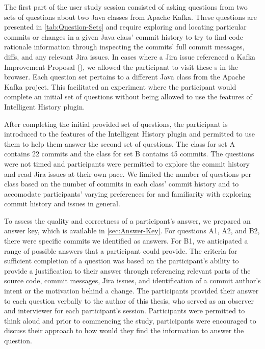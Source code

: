 The first part of the user study session consisted of asking questions from two sets of questions about two Java classes from Apache Kafka.
These questions are presented in \autoref{tab:Question-Sets} and require exploring and 
locating particular commits or changes in a given Java class' commit history to try to find code rationale information through inspecting the commits' full commit messages,
diffs, and any relevant Jira issues.
In cases where a Jira issue referenced a Kafka Improvement Proposal (), we allowed the participant to visit these s in the browser.
Each question set pertains to a different Java class from the Apache Kafka project.
This facilitated an experiment where the participant would complete an initial set of questions without being allowed to use the features of Intelligent History plugin.

After completing the initial provided set of questions, the participant is introduced to the features of the Intelligent History plugin and permitted to use them to help them answer the second set of questions.
The  class for set A contains 22 commits and the  class for set B contains 45 commits.
The questions were not timed and participants were permitted to explore the commit history and read Jira issues at their own pace.
We limited the number of questions per class based on the number of commits in each class' commit history and 
to accomodate participants' varying preferences for and familiarity with exploring commit history and issues in general.

To assess the quality and correctness of a participant's answer, we prepared an answer key, which is available in \autoref{sec:Answer-Key}.
For questions A1, A2, and B2, there were specific commits we identified as answers.
For B1, we anticipated a range of possible answers that a participant could provide.
The criteria for sufficient completion of a question was based on the participant's ability to provide a justification to their answer through referencing relevant parts of the source code, commit messages, Jira issues, and
identification of a commit author's intent or the motivation behind a change.
The participants provided their answer to each question verbally to the author of this thesis, who served as an observer and interviewer for each participant's session.
Participants were permitted to think aloud and prior to commencing the study,
participants were encouraged to discuss their approach to how would they find the information to answer the question.

